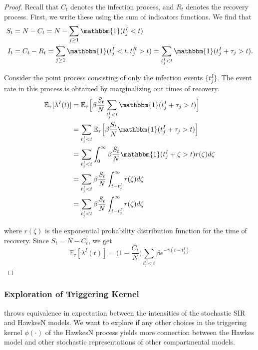 \documentclass[12pt]{article}
\begin{document}
\begin{proof} Recall that $C_t$ denotes the infection process, and $R_t$ denotes the recovery process. First, we write these using the sum of indicators functions. We find that
\begin{align*}
S_t &= N - C_t = N - \sum_{j\geq 1} \mathbbm{1} (t_j^I < t) \\
I_t &= C_t - R_t = \sum_{j\geq 1} \mathbbm{1} (t_j^I < t, t_j^R > t) = \sum_{t_j^I < t} \mathbbm{1} (t_j^I + \tau_j > t). 
\end{align*} 
 
Consider the point process consisting of only the infection events $\{t_j^I\}$. The event rate in this process is obtained by marginalizing out times of recovery. 
\begin{align*}
\mathbb{E}_\tau [ \lambda^I (t)] 
&= \mathbb{E}_\tau \Big [\beta \frac{S_t}{N} \sum_{t_j^I < t} \mathbbm{1} (t_j^I + \tau_j > t) \Big ]\\ 
&= \sum_{t_j^I < t} \mathbb{E}_\tau \Big [\beta \frac{S_t}{N}  \mathbbm{1} (t_j^I + \tau_j > t) \Big ]\\
&= \sum_{t_j^I < t}\int_0^\infty \beta \frac{S_t}{N}  \mathbbm{1} (t_j^I + \zeta > t) r(\zeta) d\zeta \\
&= \sum_{t_j^I < t} \beta \frac{S_t}{N} \int_{t - t_j^I}^\infty r(\zeta) d\zeta \\
&= \sum_{t_j^I < t} \beta \frac{S_t}{N} \int_{t - t_j^I}^\infty r(\zeta) d\zeta
\end{align*}
 
where $r(\zeta)$ is the exponential probability distribution function for the time of recovery. Since $S_t = N - C_t$, we get
$$
\mathbb{E}_\tau [ \lambda^I (t)] = \Big (1 - \frac{C_t}{N} \Big ) \sum_{t_j^I < t}  \beta e^{- \gamma (t - t_j^I)}
$$ 
 
 
 
\end{proof}








\subsubsection{Exploration of Triggering Kernel}

\cite{Rizoiu2018} throws equivalence in expectation between the intensities of the stochastic SIR and HawkesN models. We want to explore if any other choices in the triggering kernel $\phi(\cdot )$ of the HawkesN process yields more connection between the Hawkes model and other stochastic representations of other compartmental models. 
\end{document}
